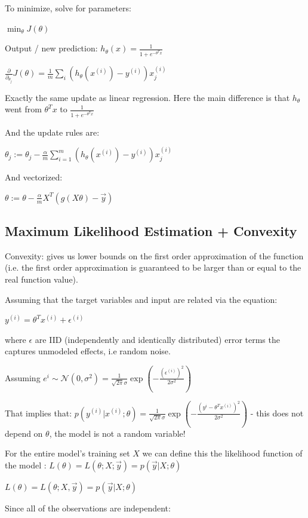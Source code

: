 To minimize, solve for parameters:

$\min_{\theta} J(\theta) $ 

Output / new prediction: $h_\theta(x) = \frac{1}{1+e^{-\theta^T x}}$

$\frac{\partial}{\partial_{\theta_j}} J(\theta) = \frac 1 m \sum_i (h_\theta(x^{(i)})-y^{(i)})x_j^{(i)}$

Exactly the same update as linear regression. Here the main difference is that $h_\theta$  went from $\theta^T x $ to $\frac{1}{1+e^{-\theta^Tx}}$

And the update rules are:

$\theta_j := \theta_j - \frac{\alpha}{m} \sum_{i=1}^m (h_\theta(x^{(i)}) - y^{(i)}) x_j^{(i)}$

And vectorized:

$\theta:=\theta - \frac{\alpha}{m}X^T(g(X\theta)-\vec{y})$

\subsection{ Maximum Likelihood Estimation + Convexity}

Convexity: gives us lower bounds on the first order approximation of the function (i.e. the first order approximation is guaranteed to be larger than or equal to the real function value).

Assuming that the target variables and input are related via the equation: 

$y^{(i)}=\theta^Tx^{(i)}+\epsilon^{(i)}$

where $\epsilon$ are IID (independently and identically distributed) error terms the captures unmodeled effects, i.e random noise.

Assuming $e^{i}\sim\mathcal{N}(0,\sigma^2)=\frac{1}{\sqrt{2\pi}\sigma}\exp\left(-\frac{(\epsilon^{(i)})^2}{2\sigma^2}\right)$

That implies that: $p(y^{(i)}|x^{(i)};\theta)=\frac{1}{\sqrt{2\pi}\sigma}\exp\left(-\frac{(y^{i}- \theta^Tx^{(i)})^2}{2\sigma^2}\right)$ - this does not depend on $\theta$, the model is not a random variable! 

For the entire model's training set $X$  we can define this the likelihood function of the model : $L(\theta)=L(\theta;X;\vec{y})=p(\vec{y}|X;\theta)$

$L(\theta) = L(\theta;X,\vec y) = p(\vec y| X;\theta)$

Since all of the observations are independent:

